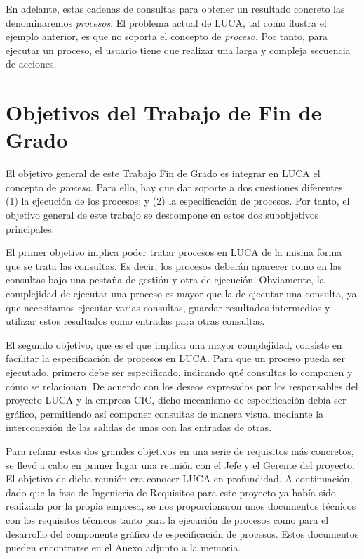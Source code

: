 En adelante, estas cadenas de consultas para obtener un resultado concreto las denominaremos \emph{procesos}. El problema actual de LUCA, tal como ilustra el ejemplo anterior, es que no soporta el concepto de \emph{proceso}. Por tanto, para ejecutar un proceso,  el usuario tiene que realizar una larga y compleja secuencia de acciones.

\section{Objetivos del Trabajo de Fin de Grado}

El objetivo general de este Trabajo Fin de Grado es integrar en LUCA el concepto de \emph{proceso}. Para ello, hay que dar soporte a dos cuestiones diferentes: (1) la ejecución de los procesos; y (2) la especificación de procesos. Por tanto, el objetivo general de este trabajo se descompone en estos dos subobjetivos principales. 

El primer objetivo implica poder tratar procesos en LUCA de la misma forma que se trata las consultas. Es decir, los procesos deberán aparecer como en las consultas bajo una pestaña de gestión y otra de ejecución. Obviamente, la complejidad de ejecutar una proceso es mayor que la de ejecutar una consulta, ya que necesitamos ejecutar varias consultas, guardar resultados intermedios y utilizar estos resultados como entradas para otras consultas.

El segundo objetivo, que es el que implica una mayor complejidad, consiste en facilitar la especificación de procesos en LUCA. Para que un proceso pueda ser ejecutado, primero debe ser especificado, indicando qué consultas lo componen y cómo se relacionan. De acuerdo con los deseos expresados por los responsables del proyecto LUCA y la empresa CIC, dicho mecanismo de especificación debía ser gráfico, permitiendo así componer consultas de manera visual mediante la interconexión de las salidas de unas con las entradas de otras.

Para refinar estos dos grandes objetivos en una serie de requisitos más concretos, se llevó a cabo en primer lugar una reunión con el Jefe y el Gerente del proyecto. El objetivo de dicha reunión era conocer LUCA en profundidad. A continuación, dado que la fase de Ingeniería de Requisitos para este proyecto ya había sido realizada por la propia empresa, se nos proporcionaron unos documentos técnicos con los requisitos técnicos tanto para la ejecución de procesos como para el desarrollo del componente gráfico de especificación de procesos. Estos documentos pueden encontrarse en el Anexo adjunto a la memoria.


